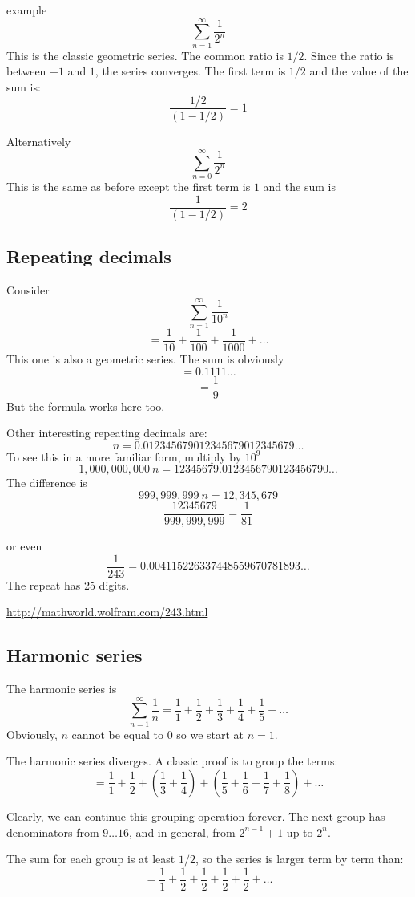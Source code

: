 \documentclass[11pt, oneside]{article}
\begin{document}
example
\[  \sum_{n=1}^{\infty} \frac{1}{2^n} \]
This is the classic geometric series.  The common ratio is $1/2$.  Since the ratio is between $-1$ and $1$, the series converges.  The first term is $1/2$ and the value of the sum is:
\[ \frac{1/2}{(1 - 1/2)} = 1 \]

Alternatively
\[  \sum_{n=0}^{\infty} \frac{1}{2^n} \]
This is the same as before except the first term is $1$ and the sum is
\[    \frac{1}{(1 - 1/2)} = 2 \]

\subsection*{Repeating decimals}
Consider
\[  \sum_{n=1}^{\infty} \frac{1}{10^n} \]
\[ = \frac{1}{10} + \frac{1}{100} + \frac{1}{1000} + \dots \]
This one is also a geometric series.  The sum is obviously
\[ = 0.1111 \dots \]
\[ = \frac{1}{9} \]
But the formula works here too.

Other interesting repeating decimals are:
\[ n = 0.012345679012345679012345679 \dots \]
To see this in a more familiar form, multiply by $10^9$
\[ 1,000,000,000 \ n = 12345679.0123456790123456790 \dots \]
The difference is 
\[ 999,999,999 \ n = 12,345,679 \]
\[ \frac{12345679}{999,999,999} = \frac{1}{81} \]

or even
\[ \frac{1}{243} = 0.004115226337448559670781893 \dots \]
The repeat has 25 digits.

\url{http://mathworld.wolfram.com/243.html}

\subsection*{Harmonic series}
The harmonic series is
\[ \sum_{n=1}^{\infty} \frac{1}{n} = \frac{1}{1} + \frac{1}{2} + \frac{1}{3} + \frac{1}{4} + \frac{1}{5} + \dots \]
Obviously, $n$ cannot be equal to $0$ so we start at $n=1$.

The harmonic series diverges.  A classic proof is to group the terms:
\[    = \frac{1}{1} + \frac{1}{2} + (\frac{1}{3} + \frac{1}{4}) + (\frac{1}{5} + \frac{1}{6} + \frac{1}{7} + \frac{1}{8}) + \dots \]
    
Clearly, we can continue this grouping operation forever.  The next group has denominators from $9 \dots 16$, and in general, from $2^{n-1} + 1$ up to $2^n$.
    
The sum for each group is at least $1/2$, so the series is larger term by term than:
\[ = \frac{1}{1} + \frac{1}{2} + \frac{1}{2} + \frac{1}{2} + \frac{1}{2} + \dots \]
\end{document}
